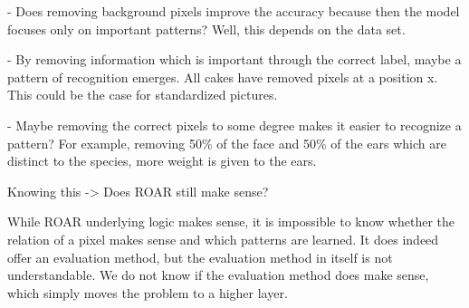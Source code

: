 - Does removing background pixels improve the accuracy because then the model focuses only on important patterns?
Well, this depends on the data set.

- By removing information which is important through the correct label, maybe a pattern of recognition emerges.
All cakes have removed pixels at a position x. This could be the case for standardized pictures.

- Maybe removing the correct pixels to some degree makes it easier to recognize a pattern? For example, removing 50\% of the face and 50\% of the ears which are distinct to the species, more weight is given to the ears.



Knowing this -> Does ROAR still make sense?

While ROAR underlying logic makes sense, it is impossible to know whether the relation of a pixel makes sense and which patterns are learned. It does indeed offer an evaluation method, but the evaluation method in itself is not understandable. We do not know if the evaluation method does make sense, which simply moves the problem to a higher layer.





